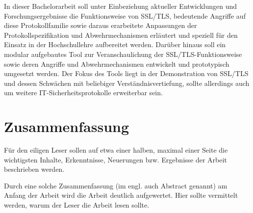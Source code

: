 \documentclass[
    12pt,
    headings=small,
    parskip=half,           %
    bibliography=totoc,
    numbers=noenddot,       %
    open=any,               %
   final                   %
    ]{scrreprt}
\begin{document}
In dieser Bachelorarbeit soll unter Einbeziehung aktueller Entwicklungen und Forschungsergebnisse die Funktionsweise von SSL/TLS, bedeutende Angriffe auf diese Protokollfamilie sowie daraus erarbeitete Anpassungen der Protokollspezifikation und Abwehrmechanismen erläutert und speziell für den Einsatz in der Hochschullehre aufbereitet werden. Darüber hinaus soll ein modular aufgebautes Tool zur Veranschaulichung der SSL/TLS-Funktionsweise sowie deren Angriffe und Abwehrmechanismen entwickelt und prototypisch umgesetzt werden. Der Fokus des Tools liegt in der Demonstration von SSL/TLS und dessen Schwächen mit beliebiger Verständnisvertiefung, sollte allerdings auch um weitere IT-Sicherheitsprotokolle erweiterbar sein.

\chapter*{Zusammenfassung}


Für den eiligen Leser sollen auf etwa einer halben, maximal einer Seite die wichtigsten Inhalte, Erkenntnisse, Neuerungen bzw. Ergebnisse der Arbeit beschrieben werden.

Durch eine solche Zusammenfassung (im engl. auch Abstract genannt) am Anfang der Arbeit wird die Arbeit deutlich aufgewertet. Hier sollte vermittelt werden, warum der Leser die Arbeit lesen sollte.

\setcounter{tocdepth}{1}
\tableofcontents


















\listoftodos
\end{document}
